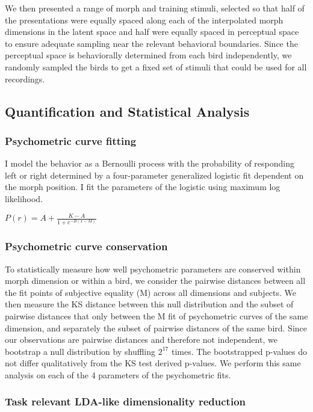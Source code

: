 We then presented a range of morph and training stimuli, selected so that half of the presentations were equally spaced along each of the interpolated morph dimensions in the latent space and half were equally spaced in perceptual space to ensure adequate sampling near the relevant behavioral boundaries. Since the perceptual space is behaviorally determined from each bird independently, we randomly sampled the birds to get a fixed set of stimuli that could be used for all recordings.


\subsection{Quantification and Statistical Analysis}

\subsubsection{Psychometric curve fitting}
I model the behavior as a Bernoulli process with the probability of responding left or right determined by a four-parameter generalized logistic fit dependent on the morph position. I fit the parameters of the logistic using maximum log likelihood.

$P(r) = A + \frac{K - A}{1 + e^{-B(x-M)}}$

\subsubsection{Psychometric curve conservation}
To statistically measure how well psychometric parameters are conserved within morph dimension or within a bird, we consider the pairwise distances between all the fit points of subjective equality (M) across all dimensions and subjects. We then measure the \ac{KS} distance between this null distribution and the subset of pairwise distances that only between the M fit of psychometric curves of the same dimension, and separately the subset of pairwise distances of the same bird. Since our observations are pairwise distances and therefore not independent, we bootstrap a null distribution by shuffling $2^{17}$ times. The bootstrapped p-values do not differ qualitatively from the KS test derived p-values. We perform this same analysis on each of the 4 parameters of the psychometric fits.

\subsubsection{Task relevant LDA-like dimensionality reduction}

